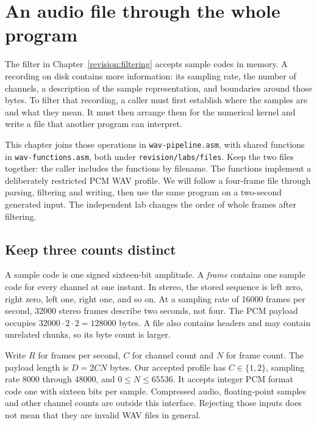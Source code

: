\chapter{An audio file through the whole program}
\label{revision:wav}

The filter in Chapter~\ref{revision:filtering} accepts sample codes in memory.
A recording on disk contains more information: its sampling rate, the number
of channels, a description of the sample representation, and boundaries around
those bytes. To filter that recording, a caller must first establish where the
samples are and what they mean. It must then arrange them for the numerical
kernel and write a file that another program can interpret.

This chapter joins those operations in \texttt{wav-pipeline.asm}, with shared
functions in \texttt{wav-functions.asm}, both under \texttt{revision/labs/files}.
Keep the two files together: the caller includes the functions by filename.
The functions implement a deliberately restricted PCM WAV profile. We will
follow a four-frame file through parsing, filtering and writing, then use the
same program on a two-second generated input. The independent lab changes the
order of whole frames after filtering.

\section{Keep three counts distinct}

A sample code is one signed sixteen-bit amplitude. A \emph{frame} contains one
sample code for every channel at one instant. In stereo, the stored sequence is
left zero, right zero, left one, right one, and so on. At a sampling rate of
16000 frames per second, 32000 stereo frames describe two seconds, not four.
The PCM payload occupies $32000\cdot2\cdot2=128000$ bytes. A file also contains
headers and may contain unrelated chunks, so its byte count is larger.

Write $R$ for frames per second, $C$ for channel count and $N$ for frame count. The payload length is
$D=2CN$ bytes. Our accepted profile has $C\in\{1,2\}$, sampling rate 8000
through 48000, and $0\leq N\leq65536$. It accepts integer PCM format code one
with sixteen bits per sample. Compressed audio, floating-point samples and other
channel counts are outside this interface. Rejecting those inputs does not mean
that they are invalid WAV files in general.

